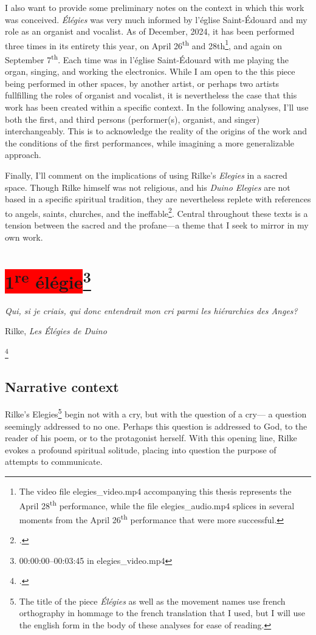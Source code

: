 \documentclass[12pt,twoside,maitrise]{dms_ks}
\theoremstyle{definition}
\begin{document}
{I also want to provide some preliminary notes on the context in which this work was conceived. 
\textit{Élégies} was very much informed by l'église Saint-Édouard and my role as an organist and vocalist. 
As of December, 2024, it has been performed three times in its entirety this year, on April 26\textsuperscript{th} and 28{th}\footnote{The video file elegies\_video.mp4 accompanying this thesis represents the April 28\textsuperscript{th} performance, while the file elegies\_audio.mp4 splices in several moments from the April 26\textsuperscript{th} performance that were more successful.}, and again on September 7\textsuperscript{th}.
Each time was in l'église Saint-Édouard with me playing the organ, singing, and working the electronics.
While I am open to the this piece being performed in other spaces, by another artist, or perhaps two artists fullfilling the roles of organist and vocalist, it is nevertheless the case that this work has been created within a specific context. 
In the following analyses, I'll use both the first, and third persons (performer(s), organist, and singer) interchangeably. 
This is to acknowledge the reality of the origins of the work and the conditions of the first performances, while imagining a more generalizable approach.  

Finally, I'll comment on the implications of using Rilke's \textit{Elegies} in a sacred space. 
Though Rilke himself was not religious, and his \textit{Duino Elegies} are not based in a specific spiritual tradition, they are nevertheless replete with references to angels, saints, churches, and the ineffable\footcite[147]{gass_reading_2013}.
Central throughout these texts is a tension between the sacred and the profane---a theme that I seek to mirror in my own work. 

\section{\colorbox{red}{1\textsuperscript{re} élégie}\footnote{00:00:00--00:03:45 in elegies\_video.mp4}}

\epigraph{\textit{Qui, si je criais, qui donc entendrait mon cri parmi les hiérarchies des Anges?}}{Rilke, \textit{Les Élégies de Duino}\protect\footnotemark}

\footcitetext[9]{rilke_egies_1986}

\subsection{Narrative context}
Rilke's Elegies\footnote{The title of the piece \textit{Élégies} as well as the movement names use french orthography in hommage to the french translation that I used, but I will use the english form in the body of these analyses for ease of reading.} begin not with a cry, but with the question of a cry--- a question seemingly addressed to no one.
Perhaps this question is addressed to God, to the reader of his poem, or to the protagonist herself.
With this opening line, Rilke evokes a profound spiritual solitude, placing into question the purpose of attempts to communicate.

}
\end{document}
